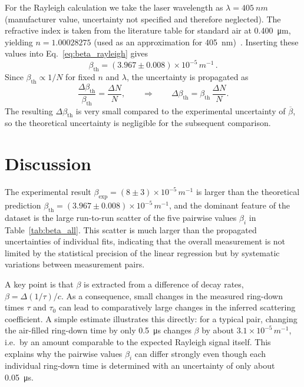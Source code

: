 \documentclass[a4paper]{article}
\begin{document}
For the Rayleigh calculation we take the laser wavelength as $\lambda=\SI{405}{nm}$ (manufacturer value, uncertainty not specified and therefore neglected).
The refractive index is taken from the literature table for standard air at \SI{0.400}{\micro\meter}, yielding $n=1.00028275$ (used as an approximation for \SI{405}{nm})~\cite{Miles2001}.
Inserting these values into Eq.~\eqref{eq:beta_rayleigh} gives
\begin{equation}
\boxed{\beta_\mathrm{th}=(3.967\pm 0.008)\times 10^{-5}\,\si{m^{-1}}} \, .
\label{eq:beta_th}
\end{equation}
Since $\beta_\mathrm{th}\propto 1/N$ for fixed $n$ and $\lambda$, the uncertainty is propagated as
\[
\frac{\Delta\beta_\mathrm{th}}{\beta_\mathrm{th}}=\frac{\Delta N}{N},
\qquad\Rightarrow\qquad
\Delta\beta_\mathrm{th}=\beta_\mathrm{th}\,\frac{\Delta N}{N}.
\]
The resulting $\Delta\beta_\mathrm{th}$ is very small compared to the experimental uncertainty of $\overline{\beta}$, so the theoretical uncertainty is negligible for the subsequent comparison.

\section{Discussion}
\label{sec:discussion}

The experimental result $\beta_\mathrm{exp}=(8\pm 3)\times 10^{-5}\,\si{m^{-1}}$ is larger than the theoretical prediction $\beta_\mathrm{th}=(3.967\pm 0.008)\times 10^{-5}\,\si{m^{-1}}$, and the dominant feature of the dataset is the large run-to-run scatter of the five pairwise values $\beta_i$ in Table~\ref{tab:beta_all}.
This scatter is much larger than the propagated uncertainties of individual fits, indicating that the overall measurement is not limited by the statistical precision of the linear regression but by systematic variations between measurement pairs.

A key point is that $\beta$ is extracted from a difference of decay rates, $\beta=\Delta(1/\tau)/c$.
As a consequence, small changes in the measured ring-down times $\tau$ and $\tau_0$ can lead to comparatively large changes in the inferred scattering coefficient.
A simple estimate illustrates this directly: for a typical pair, changing the air-filled ring-down time by only \SI{0.5}{\micro\second} changes $\beta$ by about $3.1\times 10^{-5}\,\si{m^{-1}}$, i.e.\ by an amount comparable to the expected Rayleigh signal itself.
This explains why the pairwise values $\beta_i$ can differ strongly even though each individual ring-down time is determined with an uncertainty of only about \SI{0.05}{\micro\second}.
\end{document}
